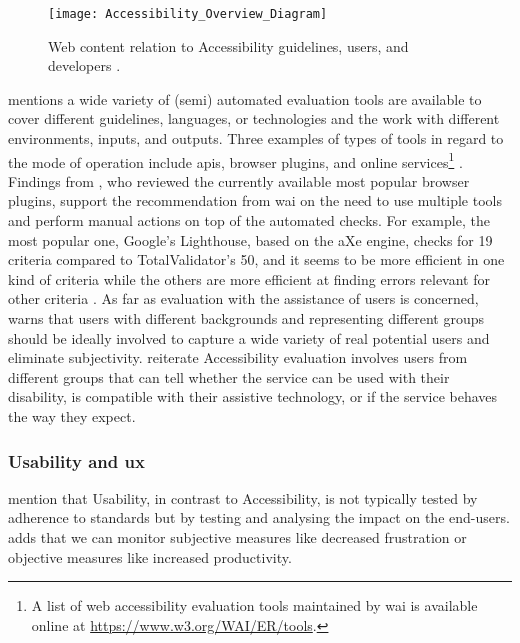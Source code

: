 \begin{figure}[H]
    \centering
    \texttt{[image: Accessibility\_Overview\_Diagram]}
    \caption{Web content relation to Accessibility guidelines, users, and developers \parencite{WAI_WCAG}.}
    \label{fig:wcag-context}
\end{figure}

\label{Accessibility-Tools}

\textcite{WAI_Evaluation_Tools} mentions a wide variety of (semi) automated evaluation tools are available to cover different guidelines, languages, or technologies and the work with different environments, inputs, and outputs.
Three examples of types of tools in regard to the mode of operation include \glspl{api}, browser plugins, and online services\footnote{A list of web accessibility evaluation tools maintained by \gls{wai} is available online at \url{https://www.w3.org/WAI/ER/tools}.} \parencite{WAI_Evaluation_Tools}.
Findings from \textcite{Frazão_Duarte_2020}, who reviewed the currently available most popular browser plugins, support the recommendation from \gls{wai} on the need to use multiple tools and perform manual actions on top of the automated checks.
For example, the most popular one, Google's Lighthouse, based on the aXe engine, checks for 19 criteria compared to TotalValidator's 50, and it seems to be more efficient in one kind of criteria while the others are more efficient at finding errors relevant for other criteria \parencite{Frazão_Duarte_2020}.
As far as evaluation with the assistance of users is concerned, \textcite{WAI_Evaluation_Users} warns that users with different backgrounds and representing different groups should be ideally involved to capture a wide variety of real potential users and eliminate subjectivity.
\textcite{Wegge_Zimmermann_2007} reiterate Accessibility evaluation involves users from different groups that can tell whether the service can be used with their disability, is compatible with their assistive technology, or if the service behaves the way they expect.

\subsubsection{Usability and \gls{ux}}

\textcite{Wegge_Zimmermann_2007} mention that Usability, in contrast to Accessibility, is not typically tested by adherence to standards but by testing and analysing the impact on the end-users.
\textcite{Edyburn_2021} adds that we can monitor subjective measures like decreased frustration or objective measures like increased productivity.

